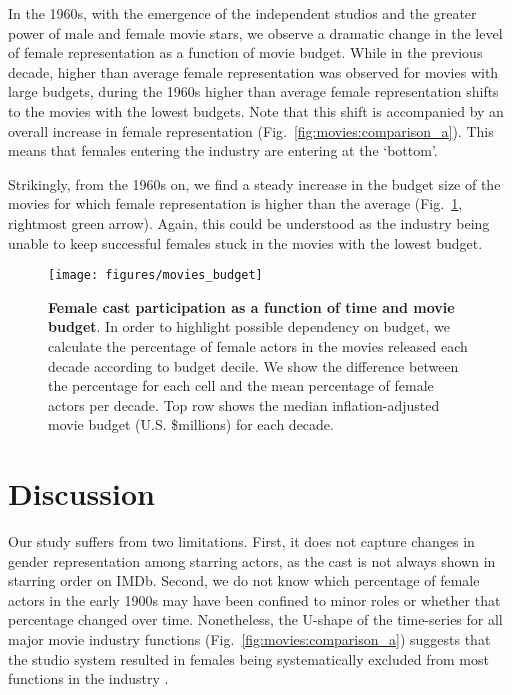 In the 1960s, with the emergence of the independent studios and the greater power of male and female movie stars, we observe a dramatic change in the level of female representation as a function of movie budget. While in the previous decade, higher than average female representation was observed for movies with large budgets, during the 1960s higher than average female representation shifts to the movies with the lowest budgets. Note that this shift is accompanied by an overall increase in female representation (Fig.~\ref{fig:movies:comparison_a}). This means that females entering the industry are entering at the `bottom'.

Strikingly, from the 1960s on, we find a steady increase in the budget size of the movies for which female representation is higher than the average (Fig.~\ref{fig:movies:budget}, rightmost green arrow). Again, this could be understood as the industry being unable to keep successful females stuck in the movies with the lowest budget.


\begin{figure}[t]
\texttt{[image: figures/movies\_budget]}
\caption[Female cast participation as a function of time and movie budget.]{\textbf{Female cast participation as a function of time and movie budget}. In order to highlight possible dependency on budget, we calculate the percentage of female actors in the movies released each decade according to budget decile. We show the difference between the percentage for each cell and the mean percentage of female actors per decade. Top row shows the median inflation-adjusted movie budget (U.S. \$millions) for each decade.}
\label{fig:movies:budget}
\end{figure}


\section{Discussion}

Our study suffers from two limitations. First, it does not capture changes in gender representation among starring actors, as the cast is not always shown in starring order on IMDb. Second, we do not know which percentage of female actors in the early 1900s may have been confined to minor roles or whether that percentage changed over time. Nonetheless, the U-shape of the time-series for all major movie industry functions (Fig.~\ref{fig:movies:comparison_a}) suggests that the studio system resulted in females being systematically excluded from most functions in the industry \cite{Smith-Doerr2010,Bielby1996,Bielby2009}.

